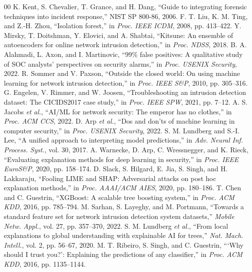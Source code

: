 \documentclass[journal]{IEEEtran}
\begin{document}
\begin{thebibliography}{00}
 K. Kent, S. Chevalier, T. Grance, and H. Dang, ``Guide to integrating forensic techniques into incident response,'' NIST SP 800-86, 2006.
 F. T. Liu, K. M. Ting, and Z.-H. Zhou, ``Isolation forest,'' in \emph{Proc. IEEE ICDM}, 2008, pp. 413--422.
 Y. Mirsky, T. Doitshman, Y. Elovici, and A. Shabtai, ``Kitsune: An ensemble of autoencoders for online network intrusion detection,'' in \emph{Proc. NDSS}, 2018.
 B. A. Alahmadi, L. Axon, and I. Martinovic, ``99\% false positives: A qualitative study of SOC analysts' perspectives on security alarms,'' in \emph{Proc. USENIX Security}, 2022.
 R. Sommer and V. Paxson, ``Outside the closed world: On using machine learning for network intrusion detection,'' in \emph{Proc. IEEE S\&P}, 2010, pp. 305--316.
 G. Engelen, V. Rimmer, and W. Joosen, ``Troubleshooting an intrusion detection dataset: The CICIDS2017 case study,'' in \emph{Proc. IEEE SPW}, 2021, pp. 7--12.
 A. S. Jacobs \emph{et al.}, ``AI/ML for network security: The emperor has no clothes,'' in \emph{Proc. ACM CCS}, 2022.
 D. Arp \emph{et al.}, ``Dos and don'ts of machine learning in computer security,'' in \emph{Proc. USENIX Security}, 2022.
 S. M. Lundberg and S.-I. Lee, ``A unified approach to interpreting model predictions,'' in \emph{Adv. Neural Inf. Process. Syst.}, vol. 30, 2017.
 A. Warnecke, D. Arp, C. Wressnegger, and K. Rieck, ``Evaluating explanation methods for deep learning in security,'' in \emph{Proc. IEEE EuroS\&P}, 2020, pp. 158--174.
 D. Slack, S. Hilgard, E. Jia, S. Singh, and H. Lakkaraju, ``Fooling LIME and SHAP: Adversarial attacks on post hoc explanation methods,'' in \emph{Proc. AAAI/ACM AIES}, 2020, pp. 180--186.
 T. Chen and C. Guestrin, ``XGBoost: A scalable tree boosting system,'' in \emph{Proc. ACM KDD}, 2016, pp. 785--794.
 M. Sarhan, S. Layeghy, and M. Portmann, ``Towards a standard feature set for network intrusion detection system datasets,'' \emph{Mobile Netw. Appl.}, vol. 27, pp. 357--370, 2022.
 S. M. Lundberg \emph{et al.}, ``From local explanations to global understanding with explainable AI for trees,'' \emph{Nat. Mach. Intell.}, vol. 2, pp. 56--67, 2020.
 M. T. Ribeiro, S. Singh, and C. Guestrin, ```Why should I trust you?': Explaining the predictions of any classifier,'' in \emph{Proc. ACM KDD}, 2016, pp. 1135--1144.

\end{thebibliography}
\end{document}

